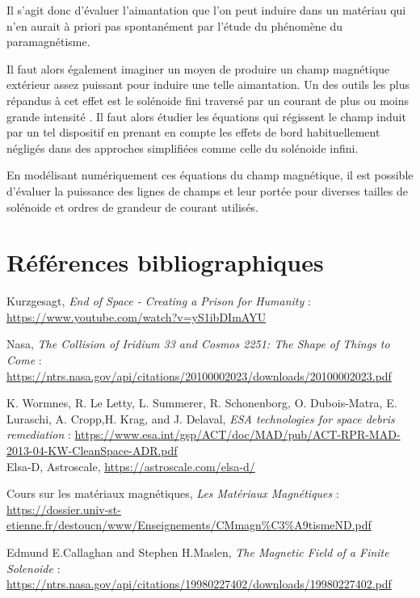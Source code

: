 \documentclass[a4paper,1pt]{article}
\begin{document}
Il s'agit donc d'évaluer l'aimantation que l'on peut induire dans un matériau qui n'en aurait à priori pas spontanément par l'étude du phénomène du paramagnétisme.

Il faut alors également imaginer un moyen de produire un champ magnétique extérieur assez puissant pour induire une telle aimantation. Un des outils les plus répandus à cet effet est le solénoide fini traversé par un courant de plus ou moins grande intensité \cite{Solenoide}. Il faut alors étudier les équations qui régissent le champ induit par un tel dispositif en prenant en compte les effets de bord habituellement négligés dans des approches simplifiées comme celle du solénoide infini. 

En modélisant numériquement ces équations du champ magnétique, il est possible d'évaluer la puissance des lignes de champs et leur portée pour diverses tailles de solénoide et ordres de grandeur de courant utilisés.
\section{Références bibliographiques}
\begin{thebibliography}{11}
	Kurzgesagt, \textit{End of Space - Creating a Prison for Humanity} :
	\url{https://www.youtube.com/watch?v=yS1ibDImAYU}

    Nasa, \textit{The Collision of Iridium 33 and Cosmos 2251: The Shape of Things to Come} : \url{https://ntrs.nasa.gov/api/citations/20100002023/downloads/20100002023.pdf}

K. Wormnes, R. Le Letty, L. Summerer, R. Schonenborg, O. Dubois-Matra, E. Luraschi, A. Cropp,H. Krag, and J. Delaval, \textit{ESA technologies for space debris remediation} :
	\url{https://www.esa.int/gsp/ACT/doc/MAD/pub/ACT-RPR-MAD-2013-04-KW-CleanSpace-ADR.pdf}\\

 Elsa-D, Astroscale, \url{https://astroscale.com/elsa-d/}

Cours sur les matériaux magnétiques, \textit{Les Matériaux Magnétiques} : \url{https://dossier.univ-st-etienne.fr/destoucn/www/Enseignements/CMmagn%C3%A9tismeND.pdf}

Edmund E.Callaghan and Stephen H.Maslen, \textit{The Magnetic Field of a Finite Solenoide} : \url{https://ntrs.nasa.gov/api/citations/19980227402/downloads/19980227402.pdf}
\end{thebibliography}
\end{document}
